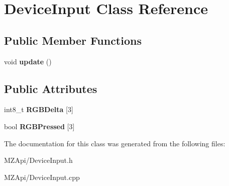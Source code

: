 \hypertarget{classDeviceInput}{}\section{Device\+Input Class Reference}
\label{classDeviceInput}
\subsection*{Public Member Functions}
\begin{DoxyCompactItemize}
\item 
void {\bfseries update} ()\hypertarget{classDeviceInput_ae6af261f4e6fa656dad4bd4a1efddbc6}{}\label{classDeviceInput_ae6af261f4e6fa656dad4bd4a1efddbc6}

\end{DoxyCompactItemize}
\subsection*{Public Attributes}
\begin{DoxyCompactItemize}
\item 
int8\+\_\+t {\bfseries R\+G\+B\+Delta} \mbox{[}3\mbox{]}\hypertarget{classDeviceInput_a2dae4108527f110262644b6a2609a213}{}\label{classDeviceInput_a2dae4108527f110262644b6a2609a213}

\item 
bool {\bfseries R\+G\+B\+Pressed} \mbox{[}3\mbox{]}\hypertarget{classDeviceInput_a27dd22c6d022b77c645899a8793d511a}{}\label{classDeviceInput_a27dd22c6d022b77c645899a8793d511a}

\end{DoxyCompactItemize}


The documentation for this class was generated from the following files\+:\begin{DoxyCompactItemize}
\item 
M\+Z\+Api/Device\+Input.\+h\item 
M\+Z\+Api/Device\+Input.\+cpp\end{DoxyCompactItemize}
